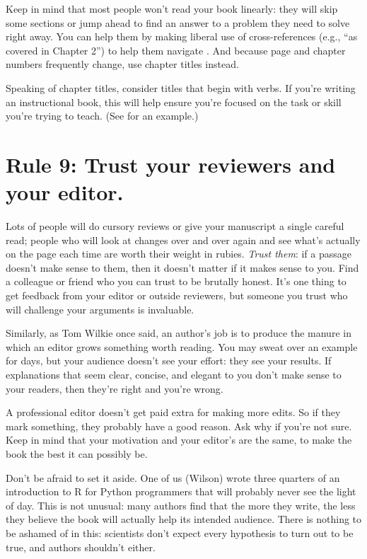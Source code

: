 \documentclass[10pt,letterpaper]{article}
\begin{document}
Keep in mind that most people won't read your book linearly: they will
skip some sections or jump ahead to find an answer to a problem they
need to solve right away.  You can help them by making liberal use of
cross-references (e.g., ``as covered in Chapter 2'') to help them
navigate \cite{Li2020}.  And because page and chapter numbers
frequently change, use chapter titles instead.

Speaking of chapter titles, consider titles that begin with verbs.  If
you're writing an instructional book, this will help ensure you're
focused on the task or skill you're trying to teach.  (See
\cite{Me2022} for an example.)

\section*{Rule 9: Trust your reviewers and your editor. }

Lots of people will do cursory reviews or give your manuscript a
single careful read; people who will look at changes over and over
again and see what's actually on the page each time are worth their
weight in rubies.  \emph{Trust them}: if a passage doesn't make sense
to them, then it doesn't matter if it makes sense to you.  Find a
colleague or friend who you can trust to be brutally honest.  It's one
thing to get feedback from your editor or outside reviewers, but
someone you trust who will challenge your arguments is invaluable.

Similarly, as Tom Wilkie once said, an author's job is to produce the
manure in which an editor grows something worth reading.  You may
sweat over an example for days, but your audience doesn't see your
effort: they see your results.  If explanations that seem clear,
concise, and elegant to you don't make sense to your readers, then
they're right and you're wrong.

A professional editor doesn't get paid extra for making more edits. So
if they mark something, they probably have a good reason. Ask why if
you're not sure. Keep in mind that your motivation and your editor's
are the same, to make the book the best it can possibly be.

Don't be afraid to set it aside. One of us (Wilson) wrote three
quarters of an introduction to R for Python programmers that will
probably never see the light of day.  This is not unusual: many
authors find that the more they write, the less they believe the book
will actually help its intended audience.  There is nothing to be
ashamed of in this: scientists don't expect every hypothesis to turn
out to be true, and authors shouldn't either.
\end{document}
